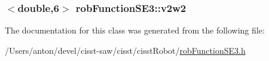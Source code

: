 \subsubsection[{v2w2}]{$<$double,6$>$ rob\+Function\+S\+E3\+::v2w2\hspace{0.3cm}{\ttfamily [protected]}}\label{classrob_function_s_e3_a9e6845bf899f02dcab9dc56d59923787}


The documentation for this class was generated from the following file\+:\begin{DoxyCompactItemize}
\item 
/\+Users/anton/devel/cisst-\/saw/cisst/cisst\+Robot/\hyperlink{rob_function_s_e3_8h}{rob\+Function\+S\+E3.\+h}\end{DoxyCompactItemize}
